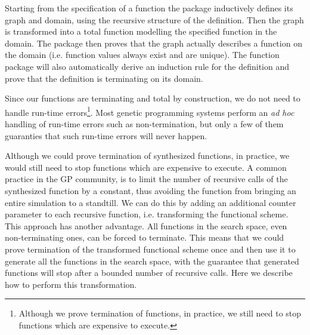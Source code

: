 Starting from the specification of a function the package inductively defines its graph and domain, using the recursive structure of the definition. Then the graph is transformed into a total function modelling the specified function in the domain. The package then proves that the graph actually describes a function on the domain (i.e. function values always exist and are unique). The function package will also automatically derive an induction rule for the definition and prove that the definition is terminating on its domain.

Since our functions are terminating and total by construction, we do not need to handle run-time errors\footnote{Although we prove termination of functions, in practice, we still need to stop functions which are expensive to execute.}. Most genetic programming systems perform an {\it ad hoc} handling of run-time errors such as non-termination, but only a few of them guaranties that such run-time errors will never happen.

Although we could prove termination of synthesized functions, in practice, we would still need to stop functions which are expensive to execute. A common practice in the GP community, is to limit the number of recursive calls of the synthesized function by a constant, thus avoiding the function from bringing an entire simulation to a standtill. We can do this by adding an additional counter parameter to each recursive function, i.e. transforming the functional scheme. This approach has another advantage. All functions in the search space, even non-terminating ones, can be forced to terminate. This means that we could prove termination of the transformed functional scheme once and then use it to generate all the functions in the search space, with the guarantee that generated functions will stop after a bounded number of recursive calls. Here we describe how to perform this transformation.


